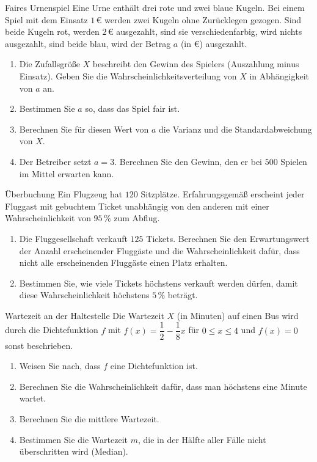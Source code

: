 \begin{uebung}{Faires Urnenspiel}
Eine Urne enthält drei rote und zwei blaue Kugeln. Bei einem Spiel mit dem Einsatz $1$\,€ werden zwei Kugeln ohne Zurücklegen gezogen. Sind beide Kugeln rot, werden $2$\,€ ausgezahlt, sind sie verschiedenfarbig, wird nichts ausgezahlt, sind beide blau, wird der Betrag $a$ (in €) ausgezahlt.
\begin{enumerate}[label=\alph*)]
  \item Die Zufallsgröße $X$ beschreibt den Gewinn des Spielers (Auszahlung minus Einsatz). Geben Sie die Wahrscheinlichkeitsverteilung von $X$ in Abhängigkeit von $a$ an.
  \item Bestimmen Sie $a$ so, dass das Spiel fair ist.
  \item Berechnen Sie für diesen Wert von $a$ die Varianz und die Standardabweichung von $X$.
  \item Der Betreiber setzt $a=3$. Berechnen Sie den Gewinn, den er bei $500$ Spielen im Mittel erwarten kann.
\end{enumerate}
\end{uebung}

\begin{uebung}{Überbuchung}
Ein Flugzeug hat $120$ Sitzplätze. Erfahrungsgemäß erscheint jeder Fluggast mit gebuchtem Ticket unabhängig von den anderen mit einer Wahrscheinlichkeit von $95\,\%$ zum Abflug.
\begin{enumerate}[label=\alph*)]
  \item Die Fluggesellschaft verkauft $125$ Tickets. Berechnen Sie den Erwartungswert der Anzahl erscheinender Fluggäste und die Wahrscheinlichkeit dafür, dass nicht alle erscheinenden Fluggäste einen Platz erhalten.
  \item Bestimmen Sie, wie viele Tickets höchstens verkauft werden dürfen, damit diese Wahrscheinlichkeit höchstens $5\,\%$ beträgt.
\end{enumerate}
\end{uebung}

\begin{uebung}{Wartezeit an der Haltestelle}
Die Wartezeit $X$ (in Minuten) auf einen Bus wird durch die Dichtefunktion $f$ mit $f(x) = \dfrac{1}{2}-\dfrac{1}{8}x$ für $0\leq x\leq 4$ und $f(x) = 0$ sonst beschrieben.
\begin{enumerate}[label=\alph*)]
  \item Weisen Sie nach, dass $f$ eine Dichtefunktion ist.
  \item Berechnen Sie die Wahrscheinlichkeit dafür, dass man höchstens eine Minute wartet.
  \item Berechnen Sie die mittlere Wartezeit.
  \item Bestimmen Sie die Wartezeit $m$, die in der Hälfte aller Fälle nicht überschritten wird (Median).
\end{enumerate}
\end{uebung}

\UebungskapitelEnde
